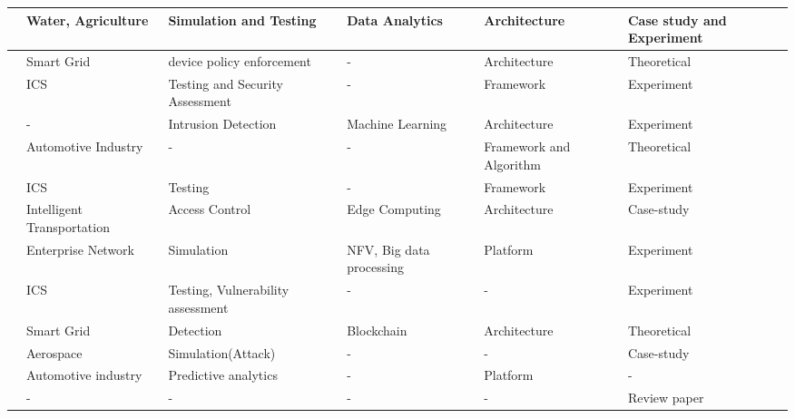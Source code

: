 \begin{longtable}{>{\small}p{0.5cm}p{2cm}p{2.9cm}p{3.0cm}p{3.0cm}p{2.0cm}}
    \cite{maillet-contozEndtoendSecurityValidation2020} & Water, Agriculture & Simulation and Testing & Data Analytics & Architecture & Case study and Experiment \\
    \hline

    \cite{giovannipaolosellittoEnablingZeroTrust2021} & Smart Grid & device policy enforcement & - & Architecture & Theoretical \\
    \hline

    \cite{dietzEmployingDigitalTwins2022} & ICS & Testing and Security Assessment & - & Framework & Experiment \\
    \hline

    \cite{sousaELEGANTSecurityCritical2021} & - & Intrusion Detection & Machine Learning & Architecture & Experiment \\
    \hline

    \cite{xuEfficientAuthenticationVehicular2021} & Automotive Industry & - & - & Framework and Algorithm & Theoretical \\
    \hline
   \cite{bittonDerivingCostEffectiveDigital2018a} & ICS & Testing & - & Framework & Experiment \\
   \hline
   \cite{glenandbensonjamesandguptamaanakandsandhuravicatheyEdgeCentricSecure2021} & Intelligent Transportation & Access Control & Edge Computing & Architecture & Case-study \\
   \hline

   \cite{wangDTCPNDigitalTwin2022} & Enterprise Network & Simulation & NFV, Big data processing & Platform & Experiment \\
   \hline

   \cite{franciaDigitalTwinsIndustrial2021} & ICS & Testing, Vulnerability assessment & - & - & Experiment \\
   \hline

   \cite{lopezDIGITALTWINSINTELLIGENT2021} & Smart Grid & Detection & Blockchain & Architecture & Theoretical \\
    \hline
    
   \cite{adrienbacueDigitalTwinsEnhanced2022} & Aerospace & Simulation(Attack) & - & - & Case-study \\
    \hline
    
   \cite{veledarDigitalTwinsDependability2019} & Automotive industry & Predictive analytics & - & Platform & - \\
   \hline

   \cite{holmesDigitalTwinsCyber2021} & - & - & - & - & Review paper \\
   \hline


\end{longtable}
